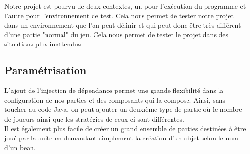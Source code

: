 Notre projet est pourvu de deux contextes, un pour l'exécution du programme et l'autre pour l'environnement de test. Cela nous permet de tester notre projet dans un environnement que l'on peut définir et qui peut donc être très différent d'une partie "normal" du jeu. Cela nous permet de tester le projet dans des situations plus inattendus.

\subsection{Paramétrisation}

L'ajout de l'injection de dépendance permet une grande flexibilité dans la configuration de nos parties et des composants qui la compose. Ainsi, sans toucher au code Java, on peut ajouter un deuxième type de partie où le nombre de joueurs ainsi que les stratégies de ceux-ci sont différentes.\\ Il est également plus facile de créer un grand ensemble de parties destinées à être joué par la suite en demandant simplement la création d'un objet selon le nom d'un bean.